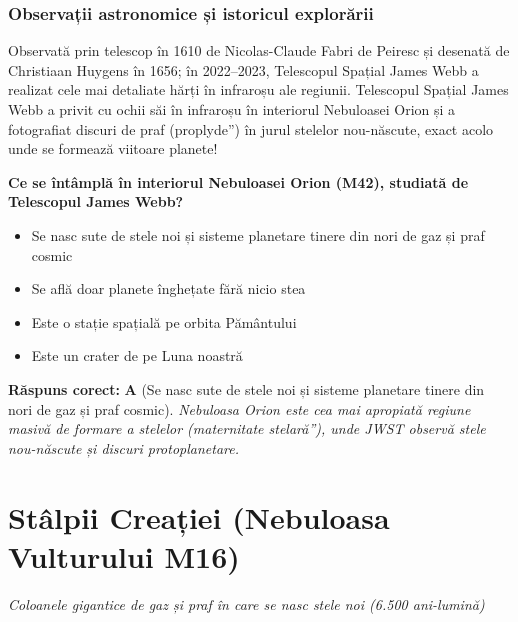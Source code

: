 \subsubsection*{Observații astronomice și istoricul explorării}
Observată prin telescop în 1610 de Nicolas-Claude Fabri de Peiresc și desenată de Christiaan Huygens în 1656; în 2022--2023, Telescopul Spațial James Webb a realizat cele mai detaliate hărți în infraroșu ale regiunii. Telescopul Spațial James Webb a privit cu ochii săi în infraroșu în interiorul Nebuloasei Orion și a fotografiat discuri de praf (\quotedblbase{}proplyde\textquotedblright{}) în jurul stelelor nou-născute, exact acolo unde se formează viitoare planete!

\vspace{6pt}
\begin{tcolorbox}[orbitarquiz, title={\textbf{Întrebare de verificare \#62: Nebuloasa Orion (M42)}}]
\textbf{Ce se întâmplă în interiorul Nebuloasei Orion (M42), studiată de Telescopul James Webb?}
\begin{itemize}[leftmargin=2.2em, itemsep=2pt, topsep=4pt]
  \item[$\square$ \textbf{A.}] Se nasc sute de stele noi și sisteme planetare tinere din nori de gaz și praf cosmic
  \item[$\square$ \textbf{B.}] Se află doar planete înghețate fără nicio stea
  \item[$\square$ \textbf{C.}] Este o stație spațială pe orbita Pământului
  \item[$\square$ \textbf{D.}] Este un crater de pe Luna noastră
\end{itemize}
\vspace{2pt}
{\footnotesize\color{orbitarMuted}\textbf{Răspuns corect:} \textbf{A} (Se nasc sute de stele noi și sisteme planetare tinere din nori de gaz și praf cosmic). \emph{Nebuloasa Orion este cea mai apropiată regiune masivă de formare a stelelor (\quotedblbase{}maternitate stelară\textquotedblright{}), unde JWST observă stele nou-născute și discuri protoplanetare.}}
\end{tcolorbox}
\clearpage


\section{Stâlpii Creației (Nebuloasa Vulturului M16)}
\label{sec:body-pillars_of_creation}
\vspace{-4pt}
{\large\itshape\color{orbitarAccent} Coloanele gigantice de gaz și praf în care se nasc stele noi (6.500 ani-lumină)}\\[4pt]



